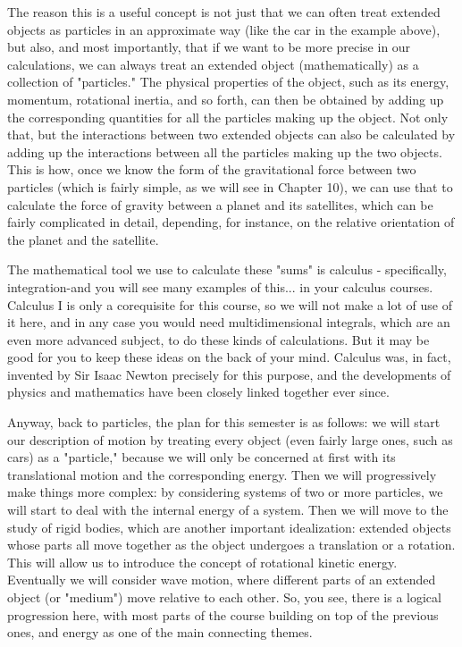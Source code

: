 \documentclass[10pt]{article}
\begin{document}
The reason this is a useful concept is not just that we can often treat extended objects as particles in an approximate way (like the car in the example above), but also, and most importantly, that if we want to be more precise in our calculations, we can always treat an extended object (mathematically) as a collection of "particles." The physical properties of the object, such as its energy, momentum, rotational inertia, and so forth, can then be obtained by adding up the corresponding quantities for all the particles making up the object. Not only that, but the interactions between two extended objects can also be calculated by adding up the interactions between all the particles making up the two objects. This is how, once we know the form of the gravitational force between two particles (which is fairly simple, as we will see in Chapter 10), we can use that to calculate the force of gravity between a planet and its satellites, which can be fairly complicated in detail, depending, for instance, on the relative orientation of the planet and the satellite.

The mathematical tool we use to calculate these "sums" is calculus - specifically, integration-and you will see many examples of this... in your calculus courses. Calculus I is only a corequisite for this course, so we will not make a lot of use of it here, and in any case you would need multidimensional integrals, which are an even more advanced subject, to do these kinds of calculations. But it may be good for you to keep these ideas on the back of your mind. Calculus was, in fact, invented by Sir Isaac Newton precisely for this purpose, and the developments of physics and mathematics have been closely linked together ever since.

Anyway, back to particles, the plan for this semester is as follows: we will start our description of motion by treating every object (even fairly large ones, such as cars) as a "particle," because we will only be concerned at first with its translational motion and the corresponding energy. Then we will progressively make things more complex: by considering systems of two or more particles, we will start to deal with the internal energy of a system. Then we will move to the study of rigid bodies, which are another important idealization: extended objects whose parts all move together as the object undergoes a translation or a rotation. This will allow us to introduce the concept of rotational kinetic energy. Eventually we will consider wave motion, where different parts of an extended object (or "medium") move relative to each other. So, you see, there is a logical progression here, with most parts of the course building on top of the previous ones, and energy as one of the main connecting themes.
\end{document}
